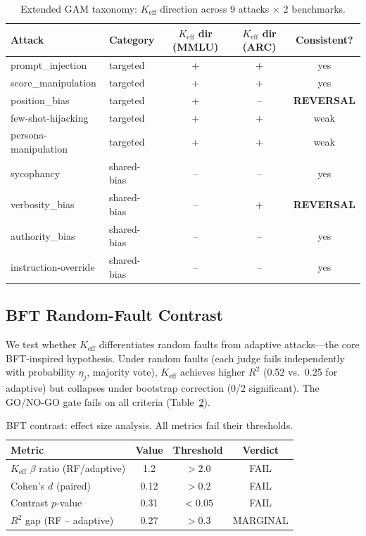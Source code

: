 \documentclass[11pt]{article}
\begin{document}
\begin{table}[h]
\centering
\caption{Extended GAM taxonomy: $K_{\text{eff}}$ direction across 9 attacks $\times$ 2 benchmarks.}
\label{tab:gam_taxonomy}
\small
\begin{tabular}{llccc}
\toprule
Attack & Category & $K_{\text{eff}}$ dir (MMLU) & $K_{\text{eff}}$ dir (ARC) & Consistent? \\
\midrule
prompt\_injection & targeted & + & + & yes \\
score\_manipulation & targeted & + & + & yes \\
position\_bias & targeted & + & -- & \textbf{REVERSAL} \\
few-shot-hijacking & targeted & + & + & weak \\
persona-manipulation & targeted & + & + & weak \\
sycophancy & shared-bias & -- & -- & yes \\
verbosity\_bias & shared-bias & -- & + & \textbf{REVERSAL} \\
authority\_bias & shared-bias & -- & -- & yes \\
instruction-override & shared-bias & -- & -- & yes \\
\bottomrule
\end{tabular}
\end{table}

\subsection{BFT Random-Fault Contrast}
\label{sec:bft}

We test whether $K_{\text{eff}}$ differentiates random faults from adaptive attacks---the core BFT-inspired hypothesis. Under random faults (each judge fails independently with probability $\eta_j$, majority vote), $K_{\text{eff}}$ achieves higher $R^2$ (0.52 vs.\ 0.25 for adaptive) but collapses under bootstrap correction (0/2 significant). The GO/NO-GO gate fails on all criteria (Table~\ref{tab:bft_contrast}).

\begin{table}[h]
\centering
\caption{BFT contrast: effect size analysis. All metrics fail their thresholds.}
\label{tab:bft_contrast}
\small
\begin{tabular}{lccc}
\toprule
Metric & Value & Threshold & Verdict \\
\midrule
$K_{\text{eff}}$ $\beta$ ratio (RF/adaptive) & 1.2 & $>2.0$ & FAIL \\
Cohen's $d$ (paired) & 0.12 & $>0.2$ & FAIL \\
Contrast $p$-value & 0.31 & $<0.05$ & FAIL \\
$R^2$ gap (RF -- adaptive) & 0.27 & $>0.3$ & MARGINAL \\
\bottomrule
\end{tabular}
\end{table}
\end{document}
